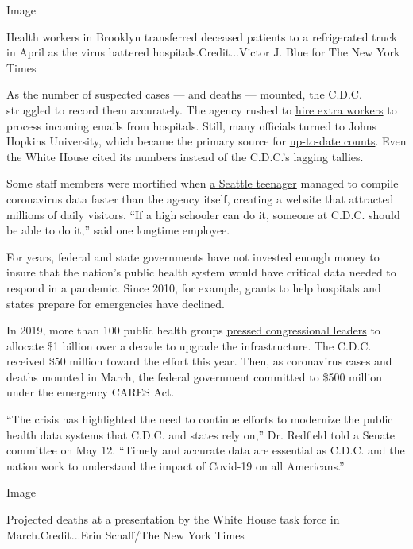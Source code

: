 Image

Health workers in Brooklyn transferred deceased patients to a
refrigerated truck in April as the virus battered
hospitals.Credit...Victor J. Blue for The New York Times

As the number of suspected cases --- and deaths --- mounted, the C.D.C.
struggled to record them accurately. The agency rushed to
\href{https://www.documentcloud.org/documents/6933941-2020-02-13-CDC-Hiring-Staff-to-Go-Through-Filings.html}{hire
extra workers} to process incoming emails from hospitals. Still, many
officials turned to Johns Hopkins University, which became the primary
source for \href{https://coronavirus.jhu.edu/us-map}{up-to-date counts}.
Even the White House cited its numbers instead of the C.D.C.'s lagging
tallies.

Some staff members were mortified when
\href{https://www.seattletimes.com/seattle-news/education/qa-avi-schiffmann-the-washington-state-teen-behind-a-coronavirus-website-with-millions-of-views/}{a
Seattle teenager} managed to compile coronavirus data faster than the
agency itself, creating a website that attracted millions of daily
visitors. ``If a high schooler can do it, someone at C.D.C. should be
able to do it,'' said one longtime employee.

For years, federal and state governments have not invested enough money
to insure that the nation's public health system would have critical
data needed to respond in a pandemic. Since 2010, for example, grants to
help hospitals and states prepare for emergencies have declined.

In 2019, more than 100 public health groups
\href{https://www.documentcloud.org/documents/6933952-2019-03-25-1-Billion-Over-10-Years-Needed-for.html}{pressed
congressional leaders} to allocate \$1 billion over a decade to upgrade
the infrastructure. The C.D.C. received \$50 million toward the effort
this year. Then, as coronavirus cases and deaths mounted in March, the
federal government committed to \$500 million under the emergency CARES
Act.

``The crisis has highlighted the need to continue efforts to modernize
the public health data systems that C.D.C. and states rely on,'' Dr.
Redfield told a Senate committee on May 12. ``Timely and accurate data
are essential as C.D.C. and the nation work to understand the impact of
Covid-19 on all Americans.''

Image

Projected deaths at a presentation by the White House task force in
March.Credit...Erin Schaff/The New York Times

